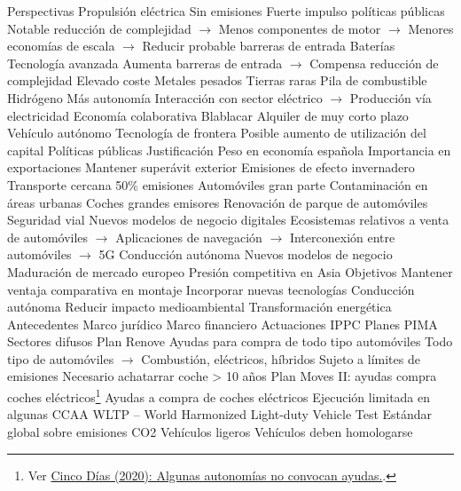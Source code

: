 \documentclass{nuevotema}
\begin{document}
\begin{esquemal}
			\3 Perspectivas
				\4 Propulsión eléctrica
				\4[] Sin emisiones
				\4[] Fuerte impulso políticas públicas
				\4[] Notable reducción de complejidad
				\4[] $\to$ Menos componentes de motor
				\4[] $\to$ Menores economías de escala
				\4[] $\to$ Reducir probable barreras de entrada
				\4 Baterías
				\4[] Tecnología avanzada
				\4[] Aumenta barreras de entrada
				\4[] $\to$ Compensa reducción de complejidad
				\4[] Elevado coste
				\4[] Metales pesados
				\4[] Tierras raras
				\4 Pila de combustible
				\4[] Hidrógeno
				\4[] Más autonomía
				\4[] Interacción con sector eléctrico
				\4[] $\to$ Producción vía electricidad
				\4 Economía colaborativa
				\4[] Blablacar
				\4[] Alquiler de muy corto plazo
				\4 Vehículo autónomo
				\4[] Tecnología de frontera
				\4[] Posible aumento de utilización del capital
		\2 Políticas públicas
			\3 Justificación
				\4 Peso en economía española
				\4 Importancia en exportaciones
				\4[] Mantener superávit exterior
				\4 Emisiones de efecto invernadero
				\4[] Transporte cercana 50\% emisiones
				\4[] Automóviles gran parte
				\4 Contaminación en áreas urbanas
				\4[] Coches grandes emisores
				\4 Renovación de parque de automóviles
				\4[]
				\4 Seguridad vial
				\4 Nuevos modelos de negocio digitales
				\4[] Ecosistemas relativos a venta de automóviles
				\4[] $\to$ Aplicaciones de navegación
				\4[] $\to$ Interconexión entre automóviles
				\4[] $\to$ 5G
				\4 Conducción autónoma
				\4 Nuevos modelos de negocio
				\4 Maduración de mercado europeo
				\4 Presión competitiva en Asia
			\3 Objetivos
				\4 Mantener ventaja comparativa en montaje
				\4 Incorporar nuevas tecnologías
				\4[] Conducción autónoma
				\4[]
				\4 Reducir impacto medioambiental
				\4 Transformación energética
			\3 Antecedentes
			\3 Marco jurídico
			\3 Marco financiero
			\3 Actuaciones
			\3 IPPC
			\3 Planes PIMA
				\4[] Sectores difusos
			\3 Plan Renove
				\4 Ayudas para compra de todo tipo automóviles
				\4 Todo tipo de automóviles
				\4[] $\to$ Combustión, eléctricos, híbridos
				\4 Sujeto a límites de emisiones
				\4 Necesario achatarrar coche > 10 años
			\3 Plan Moves II: ayudas compra coches eléctricos\footnote{Ver \href{https://cincodias.elpais.com/cincodias/2020/09/18/companias/1600426614_692764.html}{Cinco Días (2020): Algunas autonomías no convocan ayudas.}.}
				\4 Ayudas a compra de coches eléctricos
				\4 Ejecución limitada en algunas CCAA
			\3 WLTP -- World Harmonized Light-duty Vehicle Test
				\4 Estándar global sobre emisiones CO2
				\4 Vehículos ligeros
				\4 Vehículos deben homologarse

\end{esquemal}
\end{document}
